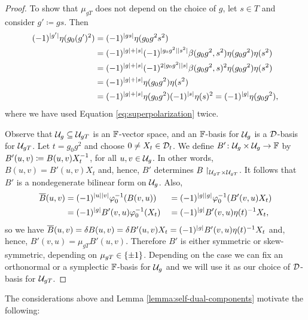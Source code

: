 \begin{proof}
    To show that $\mu_{gT}$ does not depend on the choice of $g$, let $s \in T$ and consider $g' \coloneqq gs$. 
    Then 
    \begin{align*}
        (-1)^{|g'|} \eta(g_0 (g')^2) &= (-1)^{|gs|} \eta(g_0 g^2 s^2)\\
        &= (-1)^{|g| + |s|} (-1)^{|g_0 g^2||s^2|} \beta(g_0 g^2, s^2)\eta(g_0 g^2) \eta(s^2)\\
        &= (-1)^{|g| + |s|} (-1)^{2 |g_0 g^2| |s|} \beta(g_0 g^2, s)^2 \eta(g_0 g^2) \eta(s^2) \\
        &= (-1)^{|g| + |s|} \eta(g_0 g^2) \eta(s^2) \\ 
        &= (-1)^{|g| + |s|} \eta(g_0 g^2) (-1)^{|s|} \eta (s)^2 = (-1)^{|g|} \eta(g_0 g^2),
    \end{align*}
    where we have used Equation \eqref{eq:superpolarization} twice. 
    
    Observe that $\mathcal U_g \subseteq \mathcal U_{gT}$ is an $\mathbb{F}$-vector space, and an $\mathbb{F}$-basis for $\mathcal U_g$ is a $\mathcal{D}$-basis for $\mathcal U_{gT}$. 
    Let $t=g_0 g^2$ and choose $0 \neq X_t \in \mathcal{D}_t$. 
    We define $B'\colon \mathcal U_g \times \mathcal U_g \to \mathbb{F}$ by $B'(u,v) \coloneqq B(u,v) X_t^{-1}$, for all $u, v \in \mathcal U_g$. 
    In other words, $B(u,v) = B'(u,v) X_t$ and, hence, $B'$ determines $B\restriction_{\mathcal U_{gT} \times \mathcal U_{gT}}$. 
    It follows that $B'$ is a nondegenerate bilinear form on $\mathcal U_g$. 
    Also, 
    \begin{alignat*}{3}
        \overline{B} (u, v) &= (-1)^{|u||v|} \varphi_0^{-1}( B(v, u) )
        &&= (-1)^{|g||g|} \varphi_0^{-1}( B'(v, u)X_t )\\
        &= (-1)^{|g|} B'(v, u) \varphi_0^{-1}(X_t)
        &&= (-1)^{|g|} B'(v, u) \eta(t)^{-1} X_t,
    \end{alignat*}
    so we have $\overline{B} (u, v) = \delta B (u, v) = \delta B' (u,v) X_t = (-1)^{|g|} B'(v, u) \eta(t)^{-1} X_t$ and, hence, $B'(v, u) = \mu_{gT} B'(u,v)$. 
    Therefore $B'$ is either symmetric or skew-symmetric, depending on $\mu_{gT} \in \{ \pm 1 \}$.
    Depending on the case we can fix an orthonormal or a symplectic $\mathbb{F}$-basis for $\mathcal U_g$ and we will use it as our choice of $\mathcal{D}$-basis for $\mathcal U_{gT}$. 
\end{proof}

The considerations above and Lemma \ref{lemma:self-dual-components} motivate the following:

